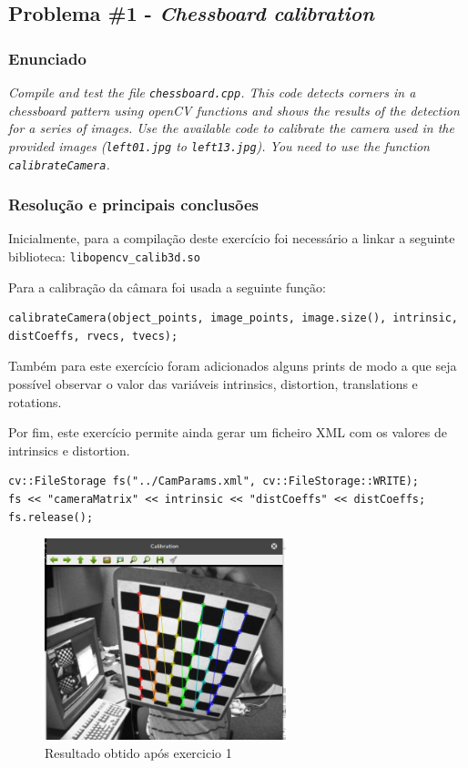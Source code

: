 \documentclass[portuguese, times, mirror]{revdetua}
\begin{document}
\subsection{Problema \#1 - \textit{Chessboard calibration}}

\subsubsection{Enunciado}
\textit{Compile and test the file \texttt{chessboard.cpp}. This code detects corners in a chessboard pattern using openCV functions and shows the results of the detection for a series of images. Use the available code to calibrate the camera used in the provided images (\texttt{left01.jpg} to \texttt{left13.jpg}). You need to use the function \texttt{calibrateCamera}.}


\subsubsection{Resolução e principais conclusões}

Inicialmente, para a compilação deste exercício foi necessário a linkar a seguinte biblioteca: \texttt{libopencv\_calib3d.so}

Para a calibração da câmara foi usada a seguinte função: 

\begin{lstlisting}[caption=Função calibrateCamera,label=code:C]
calibrateCamera(object_points, image_points, image.size(), intrinsic, distCoeffs, rvecs, tvecs);
\end{lstlisting}

Também para este exercício foram adicionados alguns prints de modo a que seja possível observar o valor das variáveis intrinsics, distortion, translations e rotations.

Por fim, este exercício permite ainda gerar um ficheiro XML com os valores de intrinsics e distortion. 

\begin{lstlisting}[caption=Guardar intrinsics e distortion em XML,label=code:C]
cv::FileStorage fs("../CamParams.xml", cv::FileStorage::WRITE);
fs << "cameraMatrix" << intrinsic << "distCoeffs" << distCoeffs;
fs.release();
\end{lstlisting}


\begin{figure}[ht!]
\centering
\includegraphics[width=70mm]{img/ex2_in.png}
\caption{Resultado obtido após exercicio 1}
\end{figure}
\end{document}
